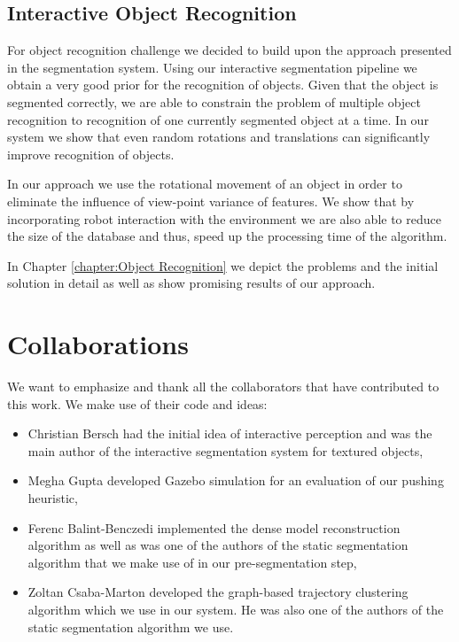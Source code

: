 \subsection{Interactive Object Recognition} 

For object recognition challenge we decided to build upon the approach presented in the segmentation system. Using our interactive segmentation pipeline we obtain a very good prior for the recognition of objects. Given that the object is segmented correctly, we are able to constrain the problem of multiple object recognition to recognition of one currently segmented object at a time. In our system we show that even random rotations and translations can significantly improve recognition of objects.

In our approach we use the rotational movement of an object in order to eliminate the influence of view-point variance of features. We show that by incorporating robot interaction with the environment we are also able to reduce the size of the database and thus, speed up the processing time of the algorithm.

In Chapter \ref{chapter:Object Recognition} we depict the problems and the initial solution in detail as well as show promising results of our approach.
    
\section{Collaborations}

We want to emphasize and thank all the collaborators that have contributed to this work. We make use of their code and ideas:

\begin{itemize} 
\item Christian Bersch had the initial idea of interactive perception and was the main author of the interactive segmentation system for textured objects,
\item Megha Gupta developed Gazebo simulation for an evaluation of our pushing heuristic,
\item Ferenc Balint-Benczedi implemented the dense model reconstruction algorithm as well as was one of the authors of the static segmentation algorithm that we make use of in our pre-segmentation step,
\item Zoltan Csaba-Marton developed the graph-based trajectory clustering algorithm which we use in our system. He was also one of the authors of the static segmentation algorithm we use.
\end{itemize}















